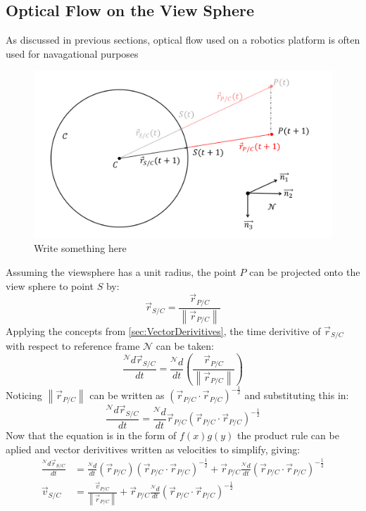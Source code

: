 \documentclass{UoNMCHA}
\newcommand{\norm}[1]{\left\lVert#1\right\rVert}
\numberwithin{equation}{section}
\begin{document}
\subsection{Optical Flow on the View Sphere}\label{sec:SphericalFlow}
As discussed in previous sections, optical flow used on a robotics platform is often used for navagational purposes
\begin{figure}[ht]
    \begin{center}
        \includegraphics[width=.8\linewidth]{Figures/MeasurementModel}
        \caption{Write something here}
        \label{fig:MeasurementModel}
    \end{center}
\end{figure}
Assuming the viewsphere has a unit radius, the point $P$ can be projected onto the view sphere to point $S$ by:
\begin{equation}\label{eq:pointOnSphere}
	\vec{r}_{S/C} = \frac{\vec{r}_{P/C}}{\norm{\vec{r}_{P/C}}}
\end{equation}
Applying the concepts from \ref{sec:VectorDerivitives}, the time derivitive of $\vec{r}_{S/C}$ with respect to reference frame $\mathcal{N}$ can be taken: 
\begin{equation}
	\frac{{}^\mathcal{N}d\vec{r}_{S/C}}{dt} = \frac{{}^\mathcal{N}d}{dt}\left(\frac{\vec{r}_{P/C}}{\norm{\vec{r}_{P/C}}}\right)
\end{equation}
Noticing $\norm{\vec{r}_{P/C}}$ can be written as $(\vec{r}_{P/C} \cdot \vec{r}_{P/C})^{-\frac{1}{2}}$ and substituting this in:
\begin{equation}
	\frac{{}^\mathcal{N}d\vec{r}_{S/C}}{dt}	= \frac{{}^\mathcal{N}d}{dt}\vec{r}_{P/C}(\vec{r}_{P/C} \cdot \vec{r}_{P/C})^{-\frac{1}{2}}
\end{equation}
Now that the equation is in the form of $f(x)g(y)$ the product rule can be aplied and vector derivitives written as velocities to simplify, giving:
\begin{equation}
	\begin{split}
		\frac{{}^\mathcal{N}d\vec{r}_{S/C}}{dt} &=\frac{{}^\mathcal{N}d}{dt}\left(\vec{r}_{P/C}\right)(\vec{r}_{P/C} \cdot \vec{r}_{P/C})^{-\frac{1}{2}} + \vec{r}_{P/C}\frac{{}^\mathcal{N}d}{dt}(\vec{r}_{P/C} \cdot \vec{r}_{P/C})^{-\frac{1}{2}}\\
		\vec{v}_{S/C} &=\frac{\vec{v}_{P/C}}{\norm{\vec{r}_{P/C}}} + \vec{r}_{P/C}\frac{{}^\mathcal{N}d}{dt}(\vec{r}_{P/C} \cdot \vec{r}_{P/C})^{-\frac{1}{2}}
	\end{split}
\end{equation}
\end{document}
